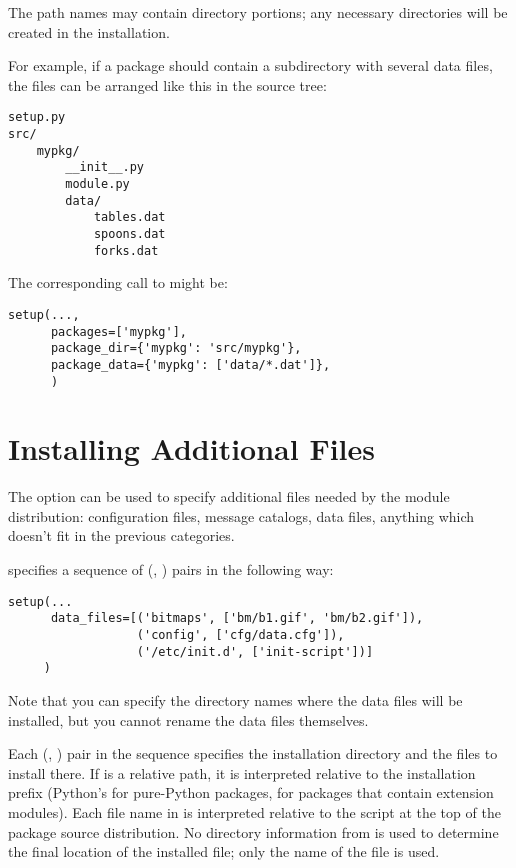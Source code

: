 \documentclass{manual}
\begin{document}
The path names may contain directory portions; any necessary
directories will be created in the installation.

For example, if a package should contain a subdirectory with several
data files, the files can be arranged like this in the source tree:

\begin{verbatim}
setup.py
src/
    mypkg/
        __init__.py
        module.py
        data/
            tables.dat
            spoons.dat
            forks.dat
\end{verbatim}

The corresponding call to  might be:

\begin{verbatim}
setup(...,
      packages=['mypkg'],
      package_dir={'mypkg': 'src/mypkg'},
      package_data={'mypkg': ['data/*.dat']},
      )
\end{verbatim}




\section{Installing Additional Files}

The  option can be used to specify additional
files needed by the module distribution: configuration files, message
catalogs, data files, anything which doesn't fit in the previous
categories.

 specifies a sequence of (,
) pairs in the following way:

\begin{verbatim}
setup(...
      data_files=[('bitmaps', ['bm/b1.gif', 'bm/b2.gif']),
                  ('config', ['cfg/data.cfg']),
                  ('/etc/init.d', ['init-script'])]
     )
\end{verbatim}

Note that you can specify the directory names where the data files
will be installed, but you cannot rename the data files themselves.

Each (, ) pair in the sequence specifies the
installation directory and the files to install there.  If
 is a relative path, it is interpreted relative to the
installation prefix (Python's  for pure-Python
packages,  for packages that contain extension
modules).  Each file name in  is interpreted relative to
the  script at the top of the package source
distribution.  No directory information from  is used to
determine the final location of the installed file; only the name of
the file is used.
\end{document}
